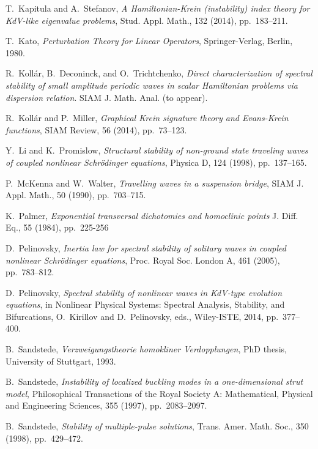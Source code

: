 \documentclass[review,onefignum,onetabnum]{siamart171218}
\begin{document}
\begin{thebibliography}{10}
{\sc T.~Kapitula and A.~Stefanov}, {\em A {Hamiltonian-Krein} (instability)
  index theory for {KdV}-like eigenvalue problems}, Stud. Appl. Math., 132
  (2014), pp.~183--211.

{\sc T.~Kato}, {\em {Perturbation Theory for Linear Operators}},
  Springer-Verlag, Berlin, 1980.

{\sc R.~Koll\'ar, B.~Deconinck, and O.~Trichtchenko}, {\em Direct
  characterization of spectral stability of small amplitude periodic waves in
  scalar {H}amiltonian problems via dispersion relation}.
\newblock SIAM J. Math. Anal. (to appear).

{\sc R.~Koll\'ar and P.~Miller}, {\em Graphical {K}rein signature theory and
  {Evans-Krein} functions}, SIAM Review, 56 (2014), pp.~73--123.

{\sc Y.~Li and K.~Promislow}, {\em Structural stability of non-ground state
  traveling waves of coupled nonlinear {S}chr\"odinger equations}, Physica D,
  124 (1998), pp.~137--165.

{\sc P.~McKenna and W.~Walter}, {\em Travelling waves in a suspension bridge},
  {SIAM} J. Appl. Math., 50 (1990), pp.~703--715.

{\sc K.~Palmer},
{\em Exponential transversal dichotomies and homoclinic points}
J. Diff. Eq., 55 (1984), pp.~225-256 

{\sc D.~Pelinovsky}, {\em Inertia law for spectral stability of solitary waves
  in coupled nonlinear {S}chr\"odinger equations}, Proc. Royal Soc. London A,
  461 (2005), pp.~783--812.

{\sc D.~Pelinovsky}, {\em Spectral stability of nonlinear waves in {KdV}-type
  evolution equations}, in Nonlinear Physical Systems: Spectral Analysis,
  Stability, and Bifurcations, O.~Kirillov and D.~Pelinovsky, eds., Wiley-ISTE,
  2014, pp.~377--400.

{\sc B.~Sandstede}, {\em Verzweigungstheorie homokliner Verdopplungen}, PhD
  thesis, University of Stuttgart, 1993.

{\sc B.~Sandstede}, {\em Instability of localized buckling modes in a
  one-dimensional strut model}, Philosophical Transactions of the Royal Society
  A: Mathematical, Physical and Engineering Sciences, 355 (1997),
  pp.~2083--2097.

{\sc B.~Sandstede}, {\em Stability of multiple-pulse solutions}, Trans. Amer.
  Math. Soc., 350 (1998), pp.~429--472.


\end{thebibliography}
\end{document}
